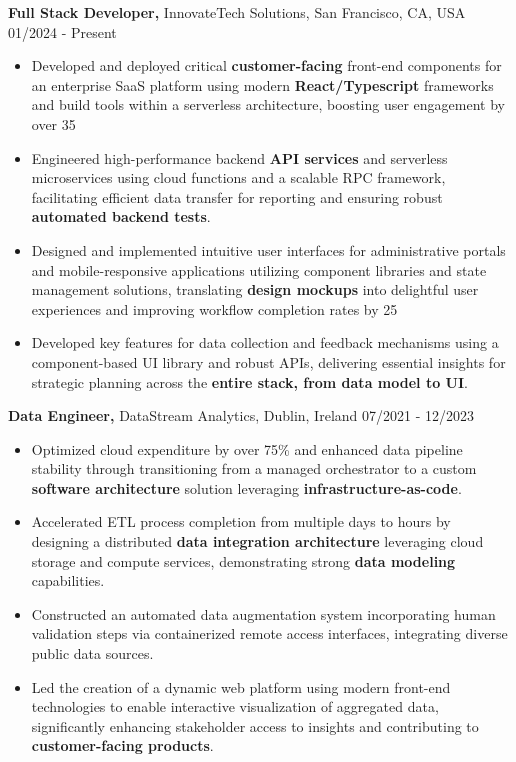 \documentclass[10pt]{article}
\newcommand{\rightaligned}[1]{\hfill #1}
\begin{document}
\textbf{Full Stack Developer,} InnovateTech Solutions, San Francisco, CA, USA  \rightaligned{01/2024 - Present}
\begin{itemize}
    \item Developed and deployed critical \textbf{customer-facing} front-end components for an enterprise SaaS platform using
      modern \textbf{React/Typescript} frameworks and build tools within a serverless architecture, boosting user
      engagement by over 35%
    \item Engineered high-performance backend \textbf{API services} and serverless microservices using cloud functions
      and a scalable RPC framework, facilitating efficient data transfer for reporting and ensuring robust
      \textbf{automated backend tests}.
    \item Designed and implemented intuitive user interfaces for administrative portals and
      mobile-responsive applications utilizing component libraries and state management solutions,
      translating \textbf{design mockups} into delightful user experiences and improving workflow completion rates by 25%
    \item Developed key features for data collection and feedback mechanisms using a component-based UI
      library and robust APIs, delivering essential insights for strategic planning across the
      \textbf{entire stack, from data model to UI}.
\end{itemize}
\vspace{1mm}
\textbf{Data Engineer,} DataStream Analytics, Dublin, Ireland             \rightaligned{07/2021 - 12/2023}
\begin{itemize}
    \item Optimized cloud expenditure by over 75\% and enhanced data pipeline stability through
      transitioning from a managed orchestrator to a custom \textbf{software architecture} solution leveraging
      \textbf{infrastructure-as-code}.
    \item Accelerated ETL process completion from multiple days to hours by designing a distributed
      \textbf{data integration architecture} leveraging cloud storage and compute services, demonstrating strong
      \textbf{data modeling} capabilities.
    \item Constructed an automated data augmentation system incorporating human validation steps via
      containerized remote access interfaces, integrating diverse public data sources.
    \item Led the creation of a dynamic web platform using modern front-end technologies to enable
      interactive visualization of aggregated data, significantly enhancing stakeholder access to
      insights and contributing to \textbf{customer-facing products}.
\end{itemize}
\end{document}
